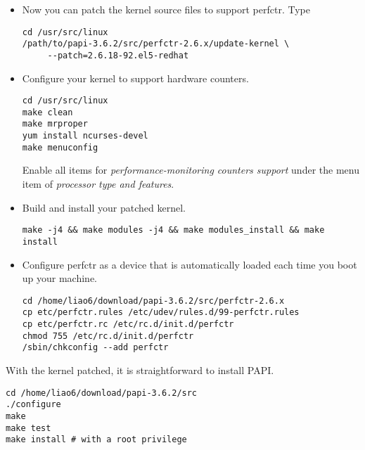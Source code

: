 \begin{itemize}
\item Now you can patch the kernel source files to support perfctr. Type 
\begin{verbatim}
cd /usr/src/linux
/path/to/papi-3.6.2/src/perfctr-2.6.x/update-kernel \
     --patch=2.6.18-92.el5-redhat
\end{verbatim}

\item Configure your kernel to support hardware counters.
\begin{verbatim}
cd /usr/src/linux 
make clean
make mrproper 
yum install ncurses-devel 
make menuconfig
\end{verbatim}
Enable all items for \textit{performance-monitoring counters support} under the menu item of \textit{processor type and features}.
\item Build and install your patched kernel. 
\begin{verbatim}
make -j4 && make modules -j4 && make modules_install && make install
\end{verbatim}
\item Configure perfctr as a device that is automatically loaded each time you boot up your machine.
\begin{verbatim}
cd /home/liao6/download/papi-3.6.2/src/perfctr-2.6.x
cp etc/perfctr.rules /etc/udev/rules.d/99-perfctr.rules
cp etc/perfctr.rc /etc/rc.d/init.d/perfctr
chmod 755 /etc/rc.d/init.d/perfctr
/sbin/chkconfig --add perfctr
\end{verbatim}
\end{itemize}
With the kernel patched, it is straightforward to install PAPI. 
\begin{verbatim}
cd /home/liao6/download/papi-3.6.2/src
./configure
make
make test
make install # with a root privilege
\end{verbatim}
